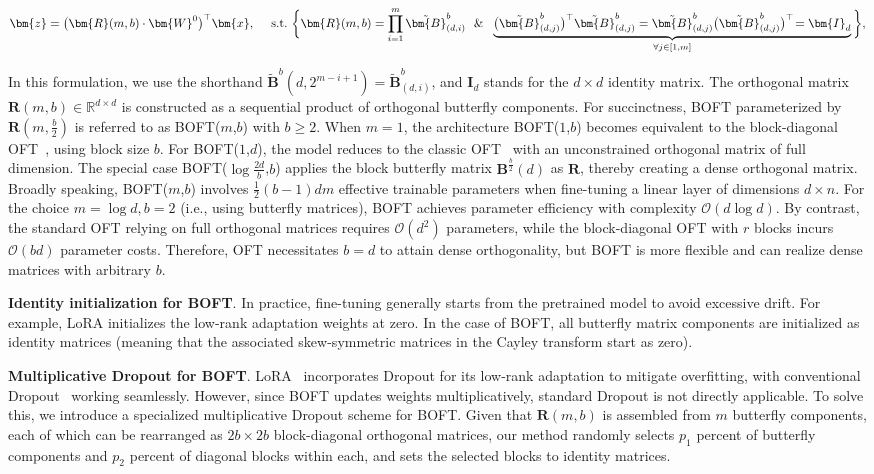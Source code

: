 \begin{equation}
    \begin{aligned}\nonumber
    \bm{z}=\big(\bm{R}(m,b)\cdot\bm{W}^0\big)^\top\bm{x},~~~~\text{s.t.}~\bigg{\{}\bm{R}(m,b)=\prod_{i=1}^m \tilde{\bm{B}}^b_{(d,i)}~~\&~~\underbrace{\big(\tilde{\bm{B}}^b_{(d,j)}\big)^\top\tilde{\bm{B}}^b_{(d,j)}=\tilde{\bm{B}}^b_{(d,j)}\big(\tilde{\bm{B}}^b_{(d,j)}\big)^\top\!=\bm{I}_d}_{\forall j\in [1, m]}\bigg{\}},
    \end{aligned}
\end{equation}

In this formulation, we use the shorthand $\tilde{\bm{B}}^b(d,2^{m - i+1}) = \tilde{\bm{B}}^b_{(d,i)}$, and $\bm{I}_d$ stands for the $d \times d$ identity matrix. The orthogonal matrix $\bm{R}(m,b)\in\mathbb{R}^{d\times d}$ is constructed as a sequential product of orthogonal butterfly components. For succinctness, BOFT parameterized by $\bm{R}(m,\frac{b}{2})$ is referred to as BOFT($m$,$b$) with $b\geq 2$. When $m=1$, the architecture BOFT($1$,$b$) becomes equivalent to the block-diagonal OFT~\cite{qiu2023controlling}, using block size $b$. For BOFT($1$,$d$), the model reduces to the classic OFT~\cite{qiu2023controlling} with an unconstrained orthogonal matrix of full dimension. The special case BOFT($\log \frac{2d}{b}$,$b$) applies the block butterfly matrix $\bm{B}^{\frac{b}{2}}(d)$ as $\bm{R}$, thereby creating a dense orthogonal matrix. Broadly speaking, BOFT($m$,$b$) involves $\frac{1}{2}(b-1)dm$ effective trainable parameters when fine-tuning a linear layer of dimensions $d\times n$. For the choice $m=\log d, b=2$ (i.e., using butterfly matrices), BOFT achieves parameter efficiency with complexity $\mathcal{O}(d\log d)$. By contrast, the standard OFT relying on full orthogonal matrices requires $\mathcal{O}(d^2)$ parameters, while the block-diagonal OFT with $r$ blocks incurs $\mathcal{O}(bd)$ parameter costs. Therefore, OFT necessitates $b=d$ to attain dense orthogonality, but BOFT is more flexible and can realize dense matrices with arbitrary $b$.

\textbf{Identity initialization for BOFT}. In practice, fine-tuning generally starts from the pretrained model to avoid excessive drift. For example, LoRA initializes the low-rank adaptation weights at zero. In the case of BOFT, all butterfly matrix components are initialized as identity matrices (meaning that the associated skew-symmetric matrices in the Cayley transform start as zero).

\textbf{Multiplicative Dropout for BOFT}. LoRA~\cite{hulora2022} incorporates Dropout for its low-rank adaptation to mitigate overfitting, with conventional Dropout~\cite{srivastava2014dropout} working seamlessly. However, since BOFT updates weights multiplicatively, standard Dropout is not directly applicable. To solve this, we introduce a specialized multiplicative Dropout scheme for BOFT. Given that $\bm{R}(m,b)$ is assembled from $m$ butterfly components, each of which can be rearranged as $2b \times 2b$ block-diagonal orthogonal matrices, our method randomly selects $p_1$ percent of butterfly components and $p_2$ percent of diagonal blocks within each, and sets the selected blocks to identity matrices.

